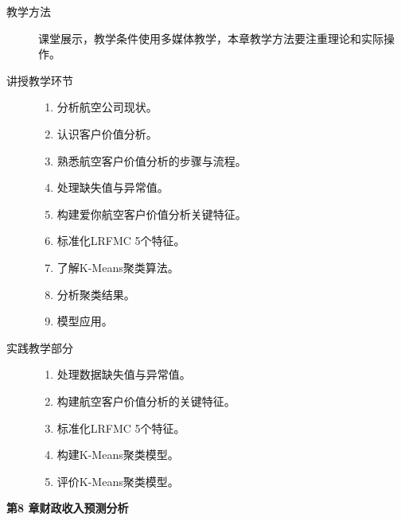 \documentclass[12pt,a4paper,openany,cap]{ctexbook}
\begin{document}
\begin{description}
\item[教学方法]课堂展示，教学条件使用多媒体教学，本章教学方法要注重理论和实际操作。
\item[讲授教学环节]
  \begin{minipage}[t]{0.8\linewidth}
    \begin{enumerate}
    \item 分析航空公司现状。
\item\label{item:203}  认识客户价值分析。
\item\label{item:204}  熟悉航空客户价值分析的步骤与流程。
\item\label{item:205}  处理缺失值与异常值。
\item\label{item:206}  构建爱你航空客户价值分析关键特征。
\item\label{item:207}  标准化LRFMC 5个特征。
\item\label{item:208}  了解K-Means聚类算法。
\item\label{item:209}  分析聚类结果。
\item\label{item:210}  模型应用。
    \end{enumerate}
  \end{minipage}

\item[实践教学部分]
  \begin{minipage}[t]{0.8\linewidth}
    \begin{enumerate}
    \item 处理数据缺失值与异常值。
\item\label{item:211}  构建航空客户价值分析的关键特征。
\item\label{item:212}  标准化LRFMC 5个特征。
\item\label{item:213}  构建K-Means聚类模型。
\item\label{item:214}  评价K-Means聚类模型。
    \end{enumerate}
  \end{minipage}

  
\end{description}


\begin{center}
   \textbf{第8 章\quad 财政收入预测分析}
\end{center}
\end{document}
